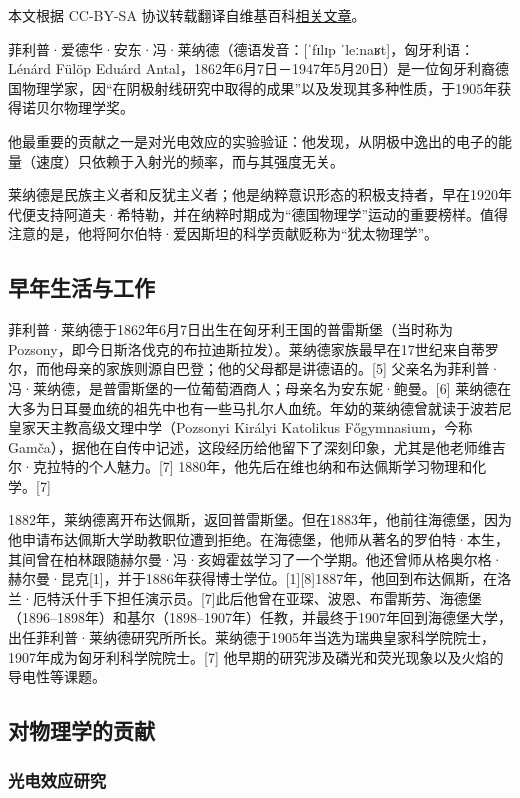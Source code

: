 
本文根据 CC-BY-SA 协议转载翻译自维基百科\href{https://en.wikipedia.org/wiki/Philipp_Lenard}{相关文章}。

菲利普·爱德华·安东·冯·莱纳德（德语发音：[ˈfɪlɪp ˈleːnaʁt]，匈牙利语：Lénárd Fülöp Eduárd Antal，1862年6月7日－1947年5月20日）是一位匈牙利裔德国物理学家，因“在阴极射线研究中取得的成果”以及发现其多种性质，于1905年获得诺贝尔物理学奖。

他最重要的贡献之一是对光电效应的实验验证：他发现，从阴极中逸出的电子的能量（速度）只依赖于入射光的频率，而与其强度无关。

莱纳德是民族主义者和反犹主义者；他是纳粹意识形态的积极支持者，早在1920年代便支持阿道夫·希特勒，并在纳粹时期成为“德国物理学”运动的重要榜样。值得注意的是，他将阿尔伯特·爱因斯坦的科学贡献贬称为“犹太物理学”。

\subsection{早年生活与工作}
菲利普·莱纳德于1862年6月7日出生在匈牙利王国的普雷斯堡（当时称为 Pozsony，即今日斯洛伐克的布拉迪斯拉发）。莱纳德家族最早在17世纪来自蒂罗尔，而他母亲的家族则源自巴登；他的父母都是讲德语的。[5] 父亲名为菲利普·冯·莱纳德，是普雷斯堡的一位葡萄酒商人；母亲名为安东妮·鲍曼。[6] 莱纳德在大多为日耳曼血统的祖先中也有一些马扎尔人血统。年幼的莱纳德曾就读于波若尼皇家天主教高级文理中学（Pozsonyi Királyi Katolikus Főgymnasium，今称 Gamča），据他在自传中记述，这段经历给他留下了深刻印象，尤其是他老师维吉尔·克拉特的个人魅力。[7]
1880年，他先后在维也纳和布达佩斯学习物理和化学。[7]

1882年，莱纳德离开布达佩斯，返回普雷斯堡。但在1883年，他前往海德堡，因为他申请布达佩斯大学助教职位遭到拒绝。在海德堡，他师从著名的罗伯特·本生，其间曾在柏林跟随赫尔曼·冯·亥姆霍兹学习了一个学期。他还曾师从格奥尔格·赫尔曼·昆克[1]，并于1886年获得博士学位。[1][8]1887年，他回到布达佩斯，在洛兰·厄特沃什手下担任演示员。[7]此后他曾在亚琛、波恩、布雷斯劳、海德堡（1896–1898年）和基尔（1898–1907年）任教，并最终于1907年回到海德堡大学，出任菲利普·莱纳德研究所所长。莱纳德于1905年当选为瑞典皇家科学院院士，1907年成为匈牙利科学院院士。[7] 他早期的研究涉及磷光和荧光现象以及火焰的导电性等课题。
\subsection{对物理学的贡献}
\subsubsection{光电效应研究}

